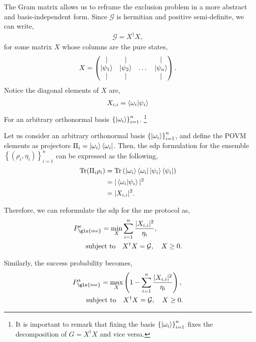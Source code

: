 \documentclass[12pt,letterpaper]{article}
\DeclareMathOperator{\tr}{Tr}
\begin{document}
\begin{multicols}{2}
The Gram matrix allows us to reframe the exclusion problem in a more abstract and basis-independent form. Since $\mathcal{G}$ is hermitian and positive semi-definite, we can write,
\begin{align*}
\mathcal{G} = X^\dagger X,
\end{align*}
for some matrix $X$ whose columns are the pure states,
\begin{align*}
	X = \begin{pmatrix}
		\mid & \mid &        & \mid \\
		\ket{\psi_1} & \ket{\psi_2} & \dots & \ket{\psi_n} \\
		\mid & \mid &        & \mid
	\end{pmatrix}.
\end{align*}
Notice the diagonal elements of $X$ are,
\begin{align*}
	X_{i,i}=\braket{\omega_i|\psi_i}
\end{align*}
For an arbitrary orthonormal basis $\left\{\ket{\omega_i}\right\}_{i=1}^n$. \footnote{It is important to remark that fixing the basis $\left\{\ket{\omega_i}\right\}_{i=1}^n$ fixes the decomposition of $G=X^\dagger X$ and vice versa.}

Let us consider an arbitrary orthonormal basis $\left\{\ket{\omega_i}\right\}_{i=1}^n$, and define the POVM elements as projectors $\Pi_i = \ket{\omega_i}\bra{\omega_i}$. Then, the \gls{sdp} formulation for the ensemble $\left\{(\rho_i,\eta_i)\right\}_{i=1}^n$ can be expressed as the following,
\begin{align*}
	\tr(\Pi_i \rho_i) &= \tr\left( \ket{\omega_i}\bra{\omega_i} \ket{\psi_i}\bra{\psi_i} \right) \\
	&= |\braket{\omega_i|\psi_i}|^2 \\
	&= |X_{i,i}|^2.
\end{align*}

Therefore, we can reformulate the \gls{sdp} for the \gls{me} protocol as,
\begin{align*}
	P_{\gls{me}}^e = \min_{X} &\sum_{i=1}^n \frac{|X_{i,i}|^2}{\eta_i},\\
	\text{subject to} \quad & X^\dagger X = \mathcal{G}, \quad X \geq 0.
\end{align*}

Similarly, the success probability becomes, 
\begin{align*}
	P_{\gls{me}}^s = \max_{X} &\left(1 - \sum_{i=1}^n \frac{|X_{i,i}|^2}{\eta_i}\right),\\
	\text{subject to} \quad & X^\dagger X = \mathcal{G}, \quad X \geq 0.
\end{align*}


\end{multicols}
\end{document}
